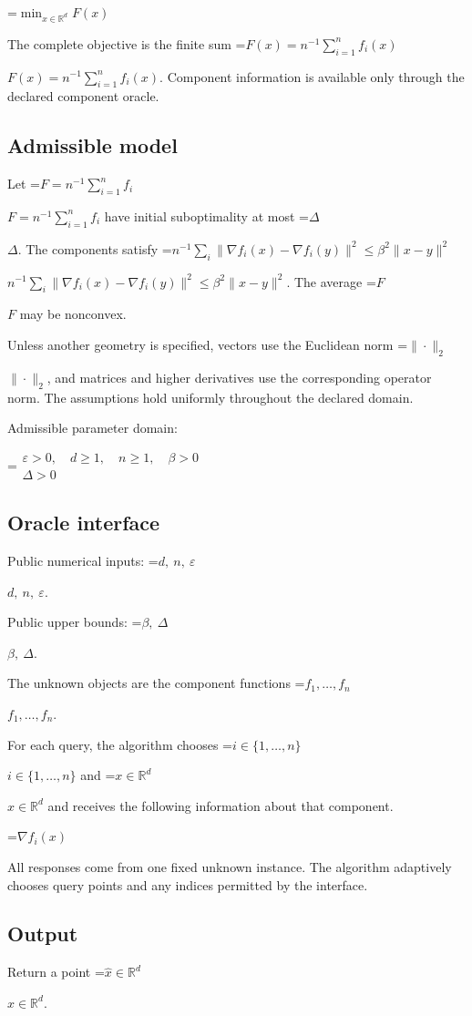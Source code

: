 \documentclass[10pt,a4paper]{article}
\newcommand{\AtlasMath}[1]{\par\begingroup\centering\setbox0=\hbox{$\displaystyle #1$}\ifdim\wd0>1.4\linewidth\typeout{ATLAS WIDE FORMULA: \the\wd0}\fi\ifdim\wd0>\linewidth\resizebox{\linewidth}{!}{\box0}\else\box0\fi\par\endgroup}
\newcommand{\AtlasInlineMath}[1]{\begingroup\setbox0=\hbox{$#1$}\ifdim\wd0>.4\linewidth\endgroup\AtlasMath{#1}\else\endgroup$#1$\fi}
\begin{document}
\AtlasMath{\min_{x\in \mathbb{R}^d}F(x)}


The complete objective is the finite sum \AtlasInlineMath{F(x)=n^{-1}\sum_{i=1}^n f_i(x)}. Component information is available only through the declared component oracle.

\subsection{Admissible model}
Let \AtlasInlineMath{F=n^{-1}\sum_{i=1}^n f_i} have initial suboptimality at most \AtlasInlineMath{\Delta}. The components satisfy \AtlasInlineMath{n^{-1}\sum_i\|\nabla f_i(x)-\nabla f_i(y)\|^2\le\beta^2\|x-y\|^2}. The average \AtlasInlineMath{F} may be nonconvex.

Unless another geometry is specified, vectors use the Euclidean norm \AtlasInlineMath{\|\cdot\|_2}, and matrices and higher derivatives use the corresponding operator norm. The assumptions hold uniformly throughout the declared domain.

Admissible parameter domain:


\AtlasMath{\begin{gathered}\varepsilon > 0,\quad d \ge 1,\quad n \ge 1,\quad \beta > 0\\\Delta > 0\end{gathered}}


\subsection{Oracle interface}
Public numerical inputs: \AtlasInlineMath{d,\ n,\ \varepsilon}.

Public upper bounds: \AtlasInlineMath{\beta,\ \Delta}.

The unknown objects are the component functions \AtlasInlineMath{f_1,\ldots,f_n}.

For each query, the algorithm chooses \AtlasInlineMath{i\in\{1,\ldots,n\}} and \AtlasInlineMath{x\in\mathbb R^d} and receives the following information about that component.


\AtlasMath{\nabla f_i(x)}


All responses come from one fixed unknown instance. The algorithm adaptively chooses query points and any indices permitted by the interface.

\subsection{Output}
Return a point \AtlasInlineMath{\widehat x\in\mathbb R^d}.
\end{document}
